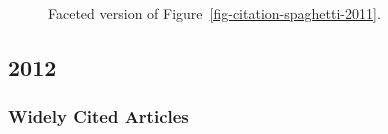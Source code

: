 \documentclass[
  10pt,
  letterpaper,
  DIV=11,
  numbers=noendperiod,
  twoside]{scrartcl}
\begin{document}
\begin{figure}


\caption{\label{fig-citation-facet-2011}Faceted version of
Figure~\ref{fig-citation-spaghetti-2011}.}

\end{figure}%

\newpage

\subsection{2012}\label{sec-s2012}

\subsubsection*{Widely Cited Articles}\label{widely-cited-articles-56}
\end{document}
